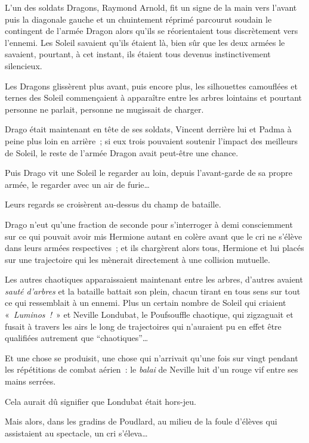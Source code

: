 \later

L'un des soldats Dragons, Raymond Arnold, fit un signe de la main vers l'avant puis la diagonale gauche et un chuintement réprimé parcourut soudain le contingent de l'armée Dragon alors qu'ils se réorientaient tous discrètement vers l'ennemi. Les Soleil savaient qu'ils étaient là, bien sûr que les deux armées le savaient, pourtant, à cet instant, ils étaient tous devenus instinctivement silencieux.

Les Dragons glissèrent plus avant, puis encore plus, les silhouettes camouflées et ternes des Soleil commençaient à apparaître entre les arbres lointains et pourtant personne ne parlait, personne ne mugissait de charger.

Drago était maintenant en tête de ses soldats, Vincent derrière lui et Padma à peine plus loin en arrière~; si eux trois pouvaient soutenir l'impact des meilleurs de Soleil, le reste de l'armée Dragon avait peut-être une chance.

Puis Drago vit une Soleil le regarder au loin, depuis l'avant-garde de sa propre armée, le regarder avec un air de furie…

Leurs regards se croisèrent au-dessus du champ de bataille.

Drago n'eut qu'une fraction de seconde pour s'interroger à demi consciemment sur ce qui pouvait avoir mis Hermione autant en colère avant que le cri ne s'élève dans leurs armées respectives~; et ils chargèrent alors tous, Hermione et lui placés sur une trajectoire qui les mènerait directement à une collision mutuelle.

\later

Les autres chaotiques apparaissaient maintenant entre les arbres, d'autres avaient \emph{sauté d'arbres} et la bataille battait son plein, chacun tirant en tous sens sur tout ce qui ressemblait à un ennemi. Plus un certain nombre de Soleil qui criaient «~\emph{Luminos~!}~» et Neville Londubat, le Poufsouffle chaotique, qui zigzaguait et fusait à travers les airs le long de trajectoires qui n'auraient pu en effet être qualifiées autrement que “chaotiques”…

Et une chose se produisit, une chose qui n'arrivait qu'une fois sur vingt pendant les répétitions de combat aérien~: le \emph{balai} de Neville luit d'un rouge vif entre ses mains serrées.

Cela aurait dû signifier que Londubat était hors-jeu.

Mais alors, dans les gradins de Poudlard, au milieu de la foule d'élèves qui assistaient au spectacle, un cri s'éleva…

